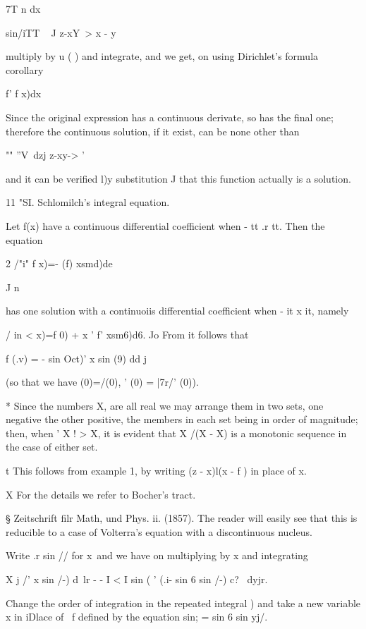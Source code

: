 {7T n dx

sin/iTT ~ J z-xY~> x - y

multiply by u ( ) and integrate, and we get, on using Dirichlet's
formula  corollary\

  f' f x)dx

Since the original expression has a continuous derivate, so has the
final one; therefore the continuous solution, if it exist, can be
none other than

"" ''V~dzj z-xy-> '

and it can be verified l)y substitution J that this function actually
is a solution.

11 "SI. Schlomilch's integral equation.

Let f(x) have a continuous differential coefficient when - tt .r tt.
Then the equation

2 /"i" f x)=- (f) xsmd)de

  J n

has one solution with a continuoiis differential coefficient when - it
x it, namely

/ in < x)=f 0) + x ' f' xsm6)d6. Jo From it follows that

f (.v) = - sin Oct)' x sin (9) dd j

(so that we have (0)=/(0), ' (0) = |7r/' (0)).

* Since the numbers X, are all real we may arrange them in two sets,
one negative the other positive, the members in each set being in
order of magnitude; then, when ' X ! > X, it is evident that X /(X -
X) is a monotonic sequence in the case of either set.

t This follows from example 1, by writing (z - x)l(x - f ) in
place of x.

X For the details we refer to Bocher's tract.

§ Zeitschrift filr Math, und Phys. ii. (1857). The reader will easily
see that this is reducible to a case of Volterra's equation with a
discontinuous nucleus.

%
%

Write .r sin // for x\ and we have on multiplying by x and integrating

X j /' x sin \//-) d\ lr - - I < I sin ( ' (.i- sin 6 sin \//-) c? \
dyjr.

Change the order of integration in the repeated integral ) and
take a new variable x in iDlace of \ f defined by the equation sin; =
sin 6 sin yj/.

}
